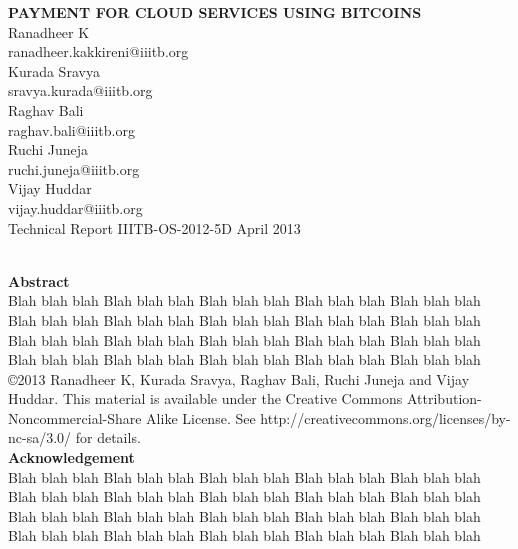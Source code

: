 \documentclass[a4page,12pt]{article}
\begin{document}
\begin{titlepage}

\begin{center}
\uppercase{\Large \textbf{Payment for Cloud Services Using BitCoins}}\\[3.0cm]

\normalsize Ranadheer K \\
ranadheer.kakkireni@iiitb.org\\[0.5cm]
Kurada Sravya\\
sravya.kurada@iiitb.org\\[0.5cm]
Raghav Bali\\
raghav.bali@iiitb.org\\[0.5cm]
Ruchi Juneja\\
ruchi.juneja@iiitb.org\\[0.5cm]
Vijay Huddar\\
vijay.huddar@iiitb.org\\[6.0cm]


Technical Report IIITB-OS-2012-5D
April 2013

\vfill

\normalsize
\end{center}

\end{titlepage}
\pagebreak
\textbf{\Large\\Abstract}\\[0.5cm]
Blah blah blah Blah blah blah Blah blah blah Blah blah blah Blah blah blah \\
Blah blah blah Blah blah blah Blah blah blah Blah blah blah Blah blah blah \\
Blah blah blah Blah blah blah Blah blah blah Blah blah blah Blah blah blah \\
Blah blah blah Blah blah blah Blah blah blah Blah blah blah Blah blah blah\\[12.0cm]
\copyright 2013 Ranadheer K, Kurada Sravya, Raghav Bali, Ruchi Juneja and Vijay Huddar. This material is available under the Creative Commons Attribution-Noncommercial-Share Alike License. See http://creativecommons.org/licenses/by-nc-sa/3.0/ for details.
\pagebreak
\textbf{\Large\\Acknowledgement}\\[0.5cm]
Blah blah blah Blah blah blah Blah blah blah Blah blah blah Blah blah blah \\
Blah blah blah Blah blah blah Blah blah blah Blah blah blah Blah blah blah \\
Blah blah blah Blah blah blah Blah blah blah Blah blah blah Blah blah blah \\
Blah blah blah Blah blah blah Blah blah blah Blah blah blah Blah blah blah\\[15.0cm]
\pagebreak
\setcounter{tocdepth}{4}
\setcounter{secnumdepth}{4}
\tableofcontents
{}
\pagebreak
\end{document}
